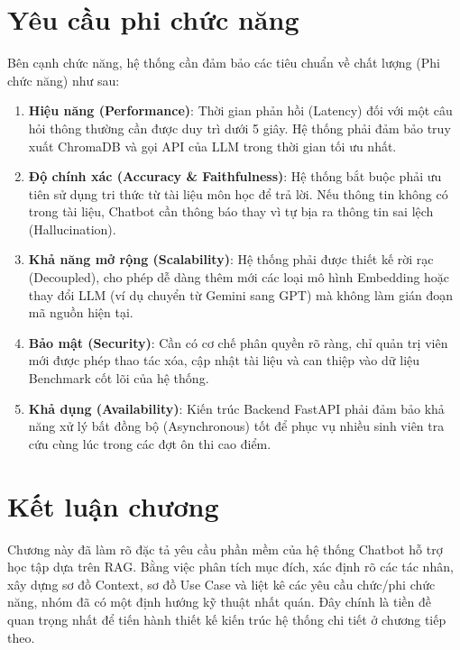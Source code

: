 \section{Yêu cầu phi chức năng}

Bên cạnh chức năng, hệ thống cần đảm bảo các tiêu chuẩn về chất lượng (Phi chức năng) như sau:
\begin{enumerate}
	\item \textbf{Hiệu năng (Performance)}: Thời gian phản hồi (Latency) đối với một câu hỏi thông thường cần được duy trì dưới 5 giây. Hệ thống phải đảm bảo truy xuất ChromaDB và gọi API của LLM trong thời gian tối ưu nhất.
	\item \textbf{Độ chính xác (Accuracy \& Faithfulness)}: Hệ thống bắt buộc phải ưu tiên sử dụng tri thức từ tài liệu môn học để trả lời. Nếu thông tin không có trong tài liệu, Chatbot cần thông báo thay vì tự bịa ra thông tin sai lệch (Hallucination).
	\item \textbf{Khả năng mở rộng (Scalability)}: Hệ thống phải được thiết kế rời rạc (Decoupled), cho phép dễ dàng thêm mới các loại mô hình Embedding hoặc thay đổi LLM (ví dụ chuyển từ Gemini sang GPT) mà không làm gián đoạn mã nguồn hiện tại.
	\item \textbf{Bảo mật (Security)}: Cần có cơ chế phân quyền rõ ràng, chỉ quản trị viên mới được phép thao tác xóa, cập nhật tài liệu và can thiệp vào dữ liệu Benchmark cốt lõi của hệ thống.
	\item \textbf{Khả dụng (Availability)}: Kiến trúc Backend FastAPI phải đảm bảo khả năng xử lý bất đồng bộ (Asynchronous) tốt để phục vụ nhiều sinh viên tra cứu cùng lúc trong các đợt ôn thi cao điểm.
\end{enumerate}

\section{Kết luận chương}

Chương này đã làm rõ đặc tả yêu cầu phần mềm của hệ thống Chatbot hỗ trợ học tập dựa trên RAG. Bằng việc phân tích mục đích, xác định rõ các tác nhân, xây dựng sơ đồ Context, sơ đồ Use Case và liệt kê các yêu cầu chức/phi chức năng, nhóm đã có một định hướng kỹ thuật nhất quán. Đây chính là tiền đề quan trọng nhất để tiến hành thiết kế kiến trúc hệ thống chi tiết ở chương tiếp theo.